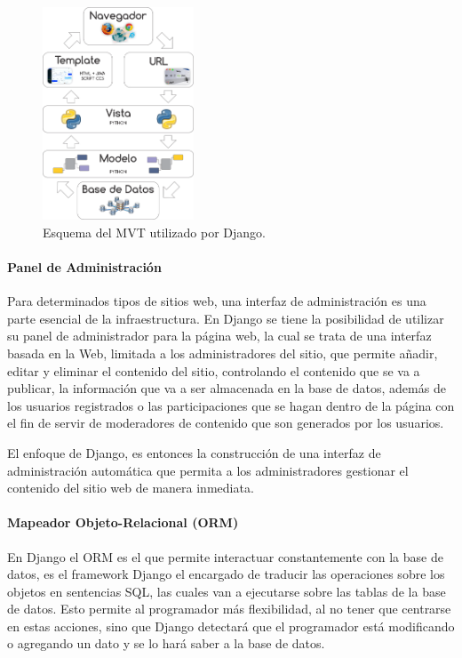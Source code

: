 \documentclass[journal,transmag]{IEEEtran}
\begin{document}
\begin{figure}[t]
\centering
\includegraphics[width=0.4\textwidth]{diagrama_MVC.png}
\caption{Esquema del MVT utilizado por Django.}
\label{fig:esq_Django}
\end{figure}

\paragraph{Panel de Administración}

Para determinados tipos de sitios web, una interfaz de administración es una parte esencial de la infraestructura. En Django se tiene la posibilidad de utilizar su panel de administrador para la página web, la cual se trata de una interfaz basada en la Web, limitada a los administradores del sitio, que permite añadir, editar y eliminar el contenido del sitio, controlando el contenido que se va a publicar, la información que va a ser almacenada en la base de datos, además de los usuarios registrados o las participaciones que se hagan dentro de la página con el fin de servir de moderadores de contenido que son generados por los usuarios. 

El enfoque de Django, es entonces la construcción de una interfaz de administración automática que permita a los administradores gestionar el contenido del sitio web de manera inmediata.

\paragraph{Mapeador Objeto-Relacional (ORM)} 

En Django el ORM es el que permite interactuar constantemente con la base de datos, es el framework Django el encargado de traducir las operaciones sobre los objetos en sentencias SQL, las cuales van a ejecutarse sobre las tablas de la base de datos. Esto permite al programador más flexibilidad, al no tener que centrarse en estas acciones, sino que Django detectará que el programador está modificando o agregando un dato y se lo hará saber a la base de datos.
\end{document}

